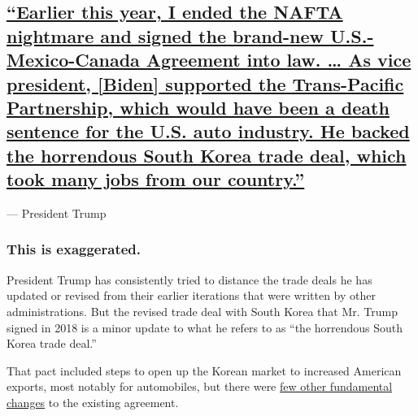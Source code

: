 \hypertarget{earlier-this-year-i-ended-the-nafta-nightmare-and-signed-the-brand-new-us-mexico-canada-agreement-into-law--as-vice-president-biden-supported-the-trans-pacific-partnership-which-would-have-been-a-death-sentence-for-the-us-auto-industry-he-backed-the-horrendous-south-korea-trade-deal-which-took-many-jobs-from-our-country}{%
\subsection{\texorpdfstring{\protect\hyperlink{earlier-this-year-i-ended-the-nafta-nightmare-and-signed-the-brand-new-us-mexico-canada-agreement-into-law-as-vice-president-bid}{``Earlier
this year, I ended the NAFTA nightmare and signed the brand-new
U.S.-Mexico-Canada Agreement into law. \ldots{} As vice president,
{[}Biden{]} supported the Trans-Pacific Partnership, which would have
been a death sentence for the U.S. auto industry. He backed the
horrendous South Korea trade deal, which took many jobs from our
country.''}}{``Earlier this year, I ended the NAFTA nightmare and signed the brand-new U.S.-Mexico-Canada Agreement into law. \ldots{} As vice president, {[}Biden{]} supported the Trans-Pacific Partnership, which would have been a death sentence for the U.S. auto industry. He backed the horrendous South Korea trade deal, which took many jobs from our country.''}}\label{earlier-this-year-i-ended-the-nafta-nightmare-and-signed-the-brand-new-us-mexico-canada-agreement-into-law--as-vice-president-biden-supported-the-trans-pacific-partnership-which-would-have-been-a-death-sentence-for-the-us-auto-industry-he-backed-the-horrendous-south-korea-trade-deal-which-took-many-jobs-from-our-country}}

--- President Trump

\hypertarget{this-is-exaggerated--3}{%
\subsubsection{This is exaggerated. }\label{this-is-exaggerated--3}}

President Trump has consistently tried to distance the trade deals he
has updated or revised from their earlier iterations that were written
by other administrations. But the revised trade deal with South Korea
that Mr. Trump signed in 2018 is a minor update to what he refers to as
``the horrendous South Korea trade deal.''

That pact included steps to open up the Korean market to increased
American exports, most notably for automobiles, but there were
\href{https://www.nytimes3xbfgragh.onion/2018/09/24/us/politics/south-korea-trump-trade-deal.html}{few
other fundamental changes} to the existing agreement.

